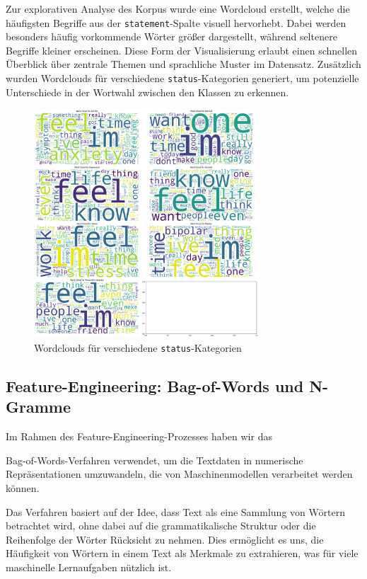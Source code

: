 \begin{enumerate}
    Zur explorativen Analyse des Korpus wurde eine Wordcloud erstellt, welche die häufigsten Begriffe aus der \texttt{statement}-Spalte visuell hervorhebt. Dabei werden besonders häufig vorkommende Wörter größer dargestellt, während seltenere Begriffe kleiner erscheinen. Diese Form der Visualisierung erlaubt einen schnellen Überblick über zentrale Themen und sprachliche Muster im Datensatz. Zusätzlich wurden Wordclouds für verschiedene \texttt{status}-Kategorien generiert, um potenzielle Unterschiede in der Wortwahl zwischen den Klassen zu erkennen.

\begin{figure}[h]
\centering
\includegraphics[width=0.75\textwidth]{images/wordcloud.png}
\caption{Wordclouds für verschiedene \texttt{status}-Kategorien}
\label{fig:wordcloud}
\end{figure}

\end{enumerate}

\newpage

\subsection{Feature-Engineering: Bag-of-Words und N-Gramme}

Im Rahmen des Feature-Engineering-Prozesses haben wir das 

Bag-of-Words-Verfahren verwendet, um die Textdaten in numerische Repräsentationen umzuwandeln, die von Maschinenmodellen verarbeitet werden können. 

Das Verfahren basiert auf der Idee, dass Text als eine Sammlung von Wörtern betrachtet wird, ohne dabei auf die grammatikalische Struktur oder die Reihenfolge der Wörter Rücksicht zu nehmen. Dies ermöglicht es uns, die Häufigkeit von Wörtern in einem Text als Merkmale zu extrahieren, was für viele maschinelle Lernaufgaben nützlich ist.

